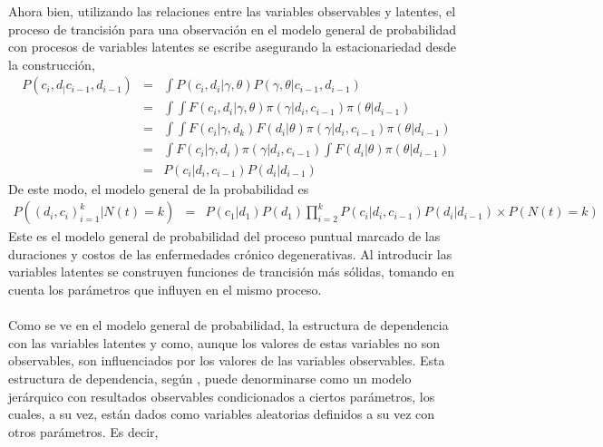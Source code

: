 Ahora bien, utilizando las relaciones entre las variables observables y latentes, el proceso de trancisi\'on para una observaci\'on en el modelo general de probabilidad con procesos de variables latentes se escribe asegurando la estacionariedad desde la construcci\'on,
\begin{eqnarray*}
P(c_i,d_|c_{i-1},d_{i-1}) &=&\int P(c_i,d_i|\gamma,\theta)P(\gamma,\theta|c_{i-1},d_{i-1})\\
&=&\int \int F(c_i,d_i|\gamma,\theta)\pi(\gamma|d_i,c_{i-1})\pi(\theta|d_{i-1})\\
&=&\int \int F(c_i|\gamma,d_k) F(d_i|\theta)\pi(\gamma|d_i,c_{i-1})\pi(\theta|d_{i-1})\\
&=&\int F(c_i|\gamma,d_i)\pi(\gamma|d_i,c_{i-1}) \int F(d_i|\theta)\pi(\theta|d_{i-1})\\
&=&P(c_i|d_i,c_{i-1})P(d_i|d_{i-1})
\end{eqnarray*}
De este modo, el modelo general de la probabilidad es
\begin{eqnarray*}
P((d_i,c_i)_{i=1}^k|N(t)=k)&=& P(c_1|d_1)P(d_1) \prod_{i=2}^k P(c_i|d_i,c_{i-1})P(d_i|d_{i-1}) \times P(N(t)=k)%
\end{eqnarray*}
Este es el modelo general de probabilidad del proceso puntual marcado de las duraciones y costos de las enfermedades cr\'onico degenerativas. Al introducir las variables latentes se construyen funciones de trancisi\'on m\'as s\'olidas, tomando en cuenta los par\'ametros que influyen en el mismo proceso.\\
\\
Como se ve en el modelo general de probabilidad, la estructura de dependencia con las variables latentes y como, aunque los valores de estas variables no son observables, son influenciados por los valores de las variables observables. Esta estructura de dependencia, seg\'un \cite{gelman2014bayesian}, puede denorminarse como un modelo jer\'arquico con resultados observables condicionados a ciertos par\'ametros, los cuales, a su vez, est\'an dados como variables aleatorias definidos a su vez con otros par\'ametros. Es decir,\\
